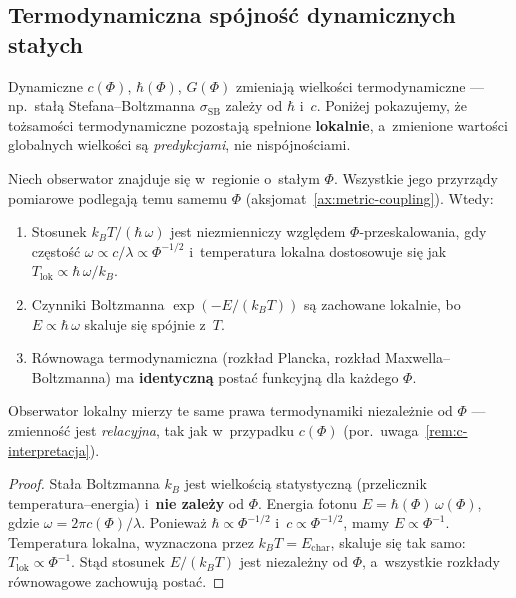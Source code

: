 \subsection{Termodynamiczna sp\'ojno\'s\'c dynamicznych sta\l{}ych}%
\label{ssec:thermo-consistency}

Dynamiczne $c(\Phi)$, $\hbar(\Phi)$, $G(\Phi)$ zmieniaj\k{a}
wielko\'sci termodynamiczne --- np.\ sta\l{}\k{a}
Stefana--Boltzmanna $\sigma_{\mathrm{SB}}$ zale\.zy od $\hbar$ i~$c$.
Poni\.zej pokazujemy, \.ze to\.zsamo\'sci termodynamiczne
pozostaj\k{a} spe\l{}nione \textbf{lokalnie}, a~zmienione
warto\'sci globalnych wielko\'sci s\k{a} \emph{predykcjami}, nie
nisp\'ojno\'sciami.

\begin{proposition}%
\label{prop:thermo-consistency}
Niech obserwator znajduje si\k{e} w~regionie o~sta\l{}ym $\Phi$.
Wszystkie jego przyrz\k{a}dy pomiarowe podlegaj\k{a} temu samemu
$\Phi$ (aksjomat~\ref{ax:metric-coupling}). Wtedy:
\begin{enumerate}[nosep]
  \item Stosunek $k_B T / (\hbar\,\omega)$ jest niezmienniczy
        wzgl\k{e}dem $\Phi$-przeskalowania, gdy cz\k{e}sto\'s\'c
        $\omega \propto c/\lambda \propto \Phi^{-1/2}$
        i~temperatura lokalna dostosowuje si\k{e} jak
        $T_{\mathrm{lok}} \propto \hbar\,\omega / k_B$.
  \item Czynniki Boltzmanna
        $\exp(-E/(k_B T))$ s\k{a} zachowane lokalnie,
        bo $E \propto \hbar\,\omega$ skaluje si\k{e} sp\'ojnie z~$T$.
  \item R\'ownowaga termodynamiczna (rozk\l{}ad Plancka,
        rozk\l{}ad Maxwella--Boltzmanna) ma \textbf{identyczn\k{a}}
        posta\'c funkcyjn\k{a} dla ka\.zdego $\Phi$.
\end{enumerate}
Obserwator lokalny mierzy te same prawa termodynamiki niezale\.znie
od $\Phi$ --- zmienno\'s\'c jest \emph{relacyjna}, tak jak
w~przypadku $c(\Phi)$ (por.\ uwaga~\ref{rem:c-interpretacja}).
\end{proposition}

\begin{proof}
Sta\l{}a Boltzmanna $k_B$ jest wielko\'sci\k{a} statystyczn\k{a}
(przelicznik temperatura--energia) i~\textbf{nie zale\.zy} od
$\Phi$. Energia fotonu $E = \hbar(\Phi)\,\omega(\Phi)$, gdzie
$\omega = 2\pi c(\Phi)/\lambda$. Poniewa\.z $\hbar \propto
\Phi^{-1/2}$ i~$c \propto \Phi^{-1/2}$, mamy
$E \propto \Phi^{-1}$. Temperatura lokalna,
wyznaczona przez $k_B T = E_{\mathrm{char}}$, skaluje si\k{e}
tak samo: $T_{\mathrm{lok}} \propto \Phi^{-1}$.
St\k{a}d stosunek $E/(k_B T)$ jest niezale\.zny od $\Phi$,
a~wszystkie rozk\l{}ady r\'ownowagowe zachowuj\k{a} posta\'c.
\end{proof}

